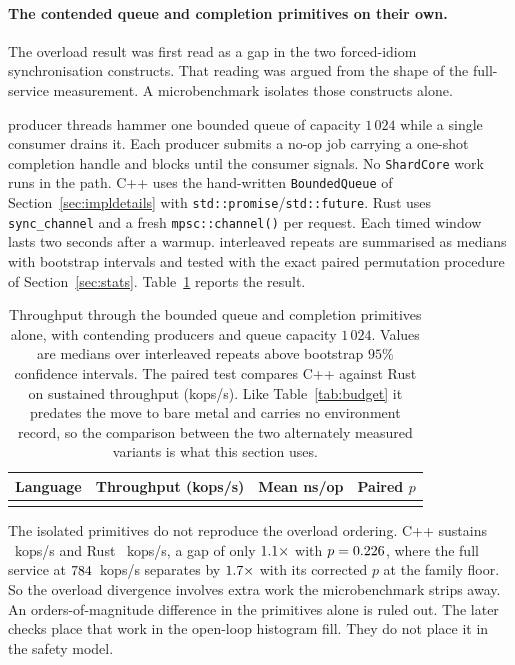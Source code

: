 \documentclass[english,oneside,a4paper,censored,csm,software-track-2020]{HYthesisML}
\begin{document}
\paragraph{The contended queue and completion primitives on their own.}\label{sec:contention}
The overload result was first read as a gap in the two forced-idiom synchronisation constructs.
That reading was argued from the shape of the full-service measurement. A microbenchmark
isolates those constructs alone.

\ContentionProducers{} producer threads hammer one bounded queue of capacity $1\,024$ while a
single consumer drains it. Each producer submits a no-op job carrying a one-shot completion handle and blocks
until the consumer signals. No \texttt{ShardCore} work runs in the path. C++ uses the
hand-written \texttt{BoundedQueue} of Section~\ref{sec:impldetails} with
\texttt{std::promise}/\texttt{std::future}. Rust uses \texttt{sync\_channel} and a fresh
\texttt{mpsc::channel()} per request. Each timed window lasts two seconds after a warmup.
\ContentionRepeats{} interleaved repeats are summarised as medians with bootstrap intervals and
tested with the exact paired permutation procedure of Section~\ref{sec:stats}.
Table~\ref{tab:contention} reports the result.

\begin{table}[tp]
\centering
\small
\caption[Throughput through the contended synchronisation primitives alone]{Throughput through
the bounded queue and completion primitives alone, with \ContentionProducers{} contending producers
and queue capacity $1\,024$. Values are medians over \ContentionRepeats{} interleaved repeats above
bootstrap $95\%$ confidence intervals. The paired test compares C++ against Rust on sustained
throughput (kops/s). Like Table~\ref{tab:budget} it predates the move to bare metal and carries no
environment record, so the comparison between the two alternately measured variants is what this section
uses.\label{tab:contention}}
\begin{tabular}{@{}l r r r@{}}
\hline\hline
Language & Throughput (kops/s) & Mean ns/op & Paired $p$ \\
\hline
\\
\hline
\end{tabular}
\end{table}

The isolated primitives do not reproduce the overload ordering. C++ sustains
\ContentionThrCpp{}~kops/s and Rust \ContentionThrRust{}~kops/s, a gap of only
$1.1\times$ with $p = 0.226$, where the full service at
$784$~kops/s separates by $1.7\times$ with its corrected $p$ at the
family floor. So the overload divergence involves extra work the microbenchmark strips away.
An orders-of-magnitude difference in the primitives alone is ruled out.
The later checks place that work in the open-loop histogram fill.
They do not place it in the safety model.
\end{document}
